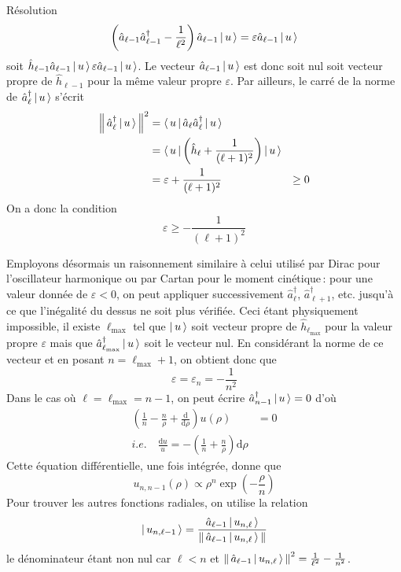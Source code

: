\begin{demo}{Résolution}
            \[ \left(\hat{a}_{\ell - 1} \hat{a}_{\ell - 1}^{\dagger} - \frac{1}{\ell^2} \right) \hat{a}_{\ell - 1} \left| \, u \, \right> = \varepsilon \hat{a}_{\ell - 1} \left| \, u \, \right> \]
            soit $\hat{h}_{\ell - 1} \hat{a}_{\ell - 1} \left| \, u \, \right> \varepsilon \hat{a}_{\ell - 1} \left| \, u \, \right>$. Le vecteur $\hat{a}_{\ell - 1} \left| \, u \, \right>$ est donc soit nul soit vecteur propre de $\hat{h}_{\ell - 1}$ pour la même valeur propre $\varepsilon$. Par ailleurs, le carré de la norme de $\hat{a}_{\ell}^{\dagger} \left| \, u \, \right>$ s’écrit 
            \begin{align*}
                \left\lVert \, \hat{a}_{\ell}^{\dagger} \left| \, u \, \right> \, \right\rVert^2
                &= \left< \, u \, \right| \hat{a}_{\ell} \hat{a}_{\ell}^{\dagger} \left| \, u \, \right> \\
                &= \left< \, u \, \right| \left(\hat{h}_{\ell} + \frac{1}{(\ell + 1)^2}\right) \left| \, u \, \right> \\
                &= \varepsilon + \frac{1}{(\ell + 1)^2}
                &\geq 0
            \end{align*}
            On a donc la condition 
            \[ \varepsilon \geq - \frac{1}{(\ell + 1)^2} \]

            Employons désormais un raisonnement similaire à celui utilisé par Dirac pour l’oscillateur harmonique ou par Cartan pour le moment cinétique : pour une valeur donnée de $\varepsilon < 0$, on peut appliquer successivement $\hat{a}_{\ell}^{\dagger}$, $\hat{a}_{\ell + 1}^{\dagger}$, etc. jusqu’à ce que l’inégalité du dessus ne soit plus vérifiée. Ceci étant physiquement impossible, il existe $\ell_{\text{max}}$ tel que $\left| \, u \, \right>$ soit vecteur propre de $\hat{h}_{\ell_{\text{max}}}$ pour la valeur propre $\varepsilon$ mais que $\hat{a}_{\ell_{\text{max}}}^{\dagger} \left| \, u \, \right>$ soit le vecteur nul. En considérant la norme de ce vecteur et en posant $n = \ell_{\text{max}} + 1$, on obtient donc que 
            \[ \varepsilon = \varepsilon_n = -\frac{1}{n^2} \]   
            Dans le cas où $\ell = \ell_{\text{max}} = n-1$, on peut écrire $\hat{a}_{n-1}^{\dagger}\left| \, u \, \right> = 0$ d’où 
            \begin{align*}
                \left(\frac{1}{n} - \frac{n}{\rho} + \frac{\text{d}}{\text{d}\rho} \right) u(\rho) &= 0 \\
                \textit{i.e.} \quad \frac{\text{d}u}{u} = - \left(\frac{1}{n} + \frac{n}{\rho}\right) \text{d}\rho
            \end{align*}
            Cette équation différentielle, une fois intégrée, donne que 
            \[ u_{n, n-1}(\rho) \propto \rho^n \exp\left(-\frac{\rho}{n}\right) \]
            Pour trouver les autres fonctions radiales, on utilise la relation 
            \[ \left| \, u_{n,\ell - 1} \, \right> = \frac{\hat{a}_{\ell - 1} \left| \, u_{n, \ell} \, \right>}{\left\lVert \, {\hat{a}_{\ell - 1} \left| \, u_{n, \ell} \, \right>} \, \right\rVert} \]
            le dénominateur étant non nul car $\ell < n$ et $\left\lVert \, {\hat{a}_{\ell - 1} \left| \, u_{n, \ell} \, \right>} \, \right\rVert^2 = \frac{1}{\ell^2} - \frac{1}{n^2}$.


\end{demo}
